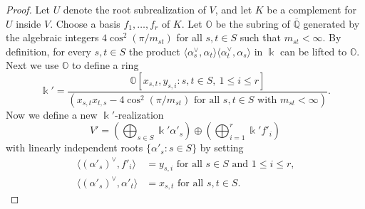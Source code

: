 \documentclass{amsart}
\theoremstyle{plain}
\theoremstyle{definition}
\theoremstyle{remark}
\numberwithin{equation}{section}
\newcommand{\ZZ}{\mathbb{Z}}
\newcommand{\QQ}{\mathbb{Q}}
\DeclareMathOperator{\Hom}{Hom}
\begin{document}
\begin{proof}
%
Let $U$ denote the root subrealization of $V$, and let $K$ be a complement for $U$ inside $V$. 
Choose a basis $f_1,\dotsc,f_r$ of $K$. %
Let $\mathbb{O}$ be the subring of $\overline{\QQ}$ generated by the algebraic integers $4\cos^2(\pi/m_{st})$ for all $s,t \in S$ such that $m_{st}<\infty$.
By definition, for every $s,t \in S$ the product $\langle \alpha_s^\vee,\alpha_t\rangle \langle \alpha_t^\vee, \alpha_s \rangle$ in $\Bbbk$ can be lifted to $\mathbb{O}$.
Next we use $\mathbb{O}$ to define a ring
\begin{equation*}
\Bbbk'=\frac{\mathbb{O}[x_{s,t},y_{s,i}: s,t \in S,\ 1 \leq i \leq r]}{(x_{s,t}x_{t,s} - 4\cos^2(\pi/m_{st}) \text{ for all $s,t \in S$ with $m_{st}<\infty$})} \text{.}
\end{equation*}
Now we define a new $\Bbbk'$-realization
\begin{equation*}
V' = \left(\bigoplus_{s \in S} \Bbbk'\alpha'_s \right) \oplus \left(\bigoplus_{i=1}^r \Bbbk' f'_i\right)
\end{equation*}
with linearly independent roots $\{\alpha'_s : s \in S\}$ by setting 
\begin{align*}
\langle (\alpha'_s)^\vee, f'_i \rangle & = y_{s,i} \text{ for all $s \in S$ and $1 \leq i \leq r$,} \\
\langle (\alpha'_s)^\vee, \alpha'_t \rangle & =x_{s,t} \text{ for all $s,t \in S$.}
\end{align*}


\end{proof}
\end{document}
